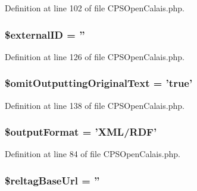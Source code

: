 Definition at line 102 of file CPSOpenCalais.php.

\hypertarget{classCPSOpenCalais_a03cbdb5a006d142963eb1f513002bdd0}{
\subsubsection[{\$externalID}]{\setlength{\rightskip}{0pt plus 5cm}\$externalID = ''}}
\label{classCPSOpenCalais_a03cbdb5a006d142963eb1f513002bdd0}


Definition at line 126 of file CPSOpenCalais.php.

\hypertarget{classCPSOpenCalais_ad0c769ee6d064c1c2e3e16ee10b3404e}{
\subsubsection[{\$omitOutputtingOriginalText}]{\setlength{\rightskip}{0pt plus 5cm}\$omitOutputtingOriginalText = 'true'}}
\label{classCPSOpenCalais_ad0c769ee6d064c1c2e3e16ee10b3404e}


Definition at line 138 of file CPSOpenCalais.php.

\hypertarget{classCPSOpenCalais_aad6ca9fda50b25879e53039e23613449}{
\subsubsection[{\$outputFormat}]{\setlength{\rightskip}{0pt plus 5cm}\$outputFormat = 'XML/RDF'}}
\label{classCPSOpenCalais_aad6ca9fda50b25879e53039e23613449}


Definition at line 84 of file CPSOpenCalais.php.

\hypertarget{classCPSOpenCalais_a68ec6608c1cf0f23c25f420586e31e77}{
\subsubsection[{\$reltagBaseUrl}]{\setlength{\rightskip}{0pt plus 5cm}\$reltagBaseUrl = ''}}
\label{classCPSOpenCalais_a68ec6608c1cf0f23c25f420586e31e77}


